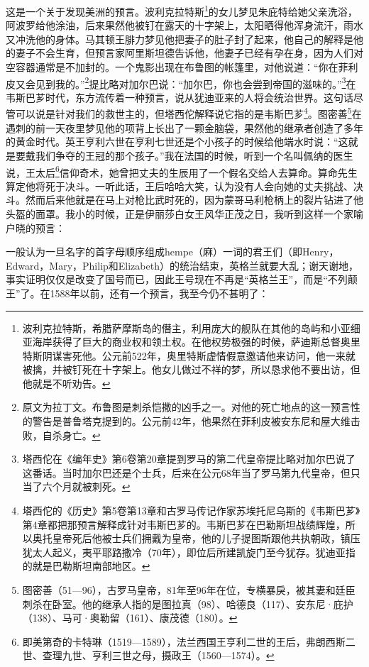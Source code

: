 \par 这是一个关于发现美洲的预言。波利克拉特斯\footnote{波利克拉特斯，希腊萨摩斯岛的僭主，利用庞大的舰队在其他的岛屿和小亚细亚海岸获得了巨大的商业权和领土权。在他权势极强的时候，萨迪斯总督奥里特斯阴谋害死他。公元前522年，奥里特斯虚情假意邀请他来访问，他一来就被擒，并被钉死在十字架上。他女儿做过不祥的梦，所以恳求他不要出访，但他就是不听劝告。}的女儿梦见朱庇特给她父亲洗浴，阿波罗给他涂油，后来果然他被钉在露天的十字架上，太阳晒得他浑身流汗，雨水又冲洗他的身体。马其顿王腓力梦见他把妻子的肚子封了起来，他自己的解释是他的妻子不会生育，但预言家阿里斯坦德告诉他，他妻子已经有孕在身，因为人们对空容器通常是不加封的。一个鬼影出现在布鲁图的帐篷里，对他说道：“你在菲利皮又会见到我的。”\footnote{原文为拉丁文。布鲁图是刺杀恺撒的凶手之一。对他的死亡地点的这一预言性的警告是普鲁塔克提到的。公元前42年，他果然在菲利皮被安东尼和屋大维击败，自杀身亡。}提比略对加尔巴说：“加尔巴，你也会尝到帝国的滋味的。”\footnote{塔西佗在《编年史》第6卷第20章提到罗马的第二代皇帝提比略对加尔巴说了这番话。当时加尔巴还是个士兵，后来在公元68年当了罗马第九代皇帝，但只当了六个月就被刺死。}在韦斯巴芗时代，东方流传着一种预言，说从犹迪亚来的人将会统治世界。这句话尽管可以说是针对我们的救世主的，但塔西佗解释说它指的是韦斯巴芗\footnote{塔西佗的《历史》第5卷第13章和古罗马传记作家苏埃托尼乌斯的《韦斯巴芗》第4章都把那预言解释成针对韦斯巴芗的。韦斯巴芗在巴勒斯坦战绩辉煌，所以奥托皇帝死后他被士兵们拥戴为皇帝，他的儿子提图斯跟他共执朝政，镇压犹太人起义，夷平耶路撒冷（70年），即位后所建凯旋门至今犹存。犹迪亚指的就是巴勒斯坦南部地区。}。图密善\footnote{图密善（51—96），古罗马皇帝，81年至96年在位，专横暴戾，被其妻和廷臣刺杀在卧室。他的继承人指的是图拉真（98）、哈德良（117）、安东尼·庇护（138）、马可·奥勒留（161）、康茂德（180）。}在遇刺的前一天夜里梦见他的项背上长出了一颗金脑袋，果然他的继承者创造了多年的黄金时代。英王亨利六世在亨利七世还是个小孩子的时候给他端水时说：“这就是要戴我们争夺的王冠的那个孩子。”我在法国的时候，听到一个名叫佩纳的医生说，王太后\footnote{即美第奇的卡特琳（1519—1589），法兰西国王亨利二世的王后，弗朗西斯二世、查理九世、亨利三世之母，摄政王（1560—1574）。}信仰奇术，她曾把丈夫的生辰用了一个假名交给人去算命。算命先生算定他将死于决斗。一听此话，王后哈哈大笑，认为没有人会向她的丈夫挑战、决斗。然而后来他就是在马上对枪比武时死的，因为蒙哥马利枪柄上的裂片钻进了他头盔的面罩。我小的时候，正是伊丽莎白女王风华正茂之日，我听到这样一个家喻户晓的预言：
\par 一般认为一旦名字的首字母顺序组成hempe（麻）一词的君王们（即Henry，Edward，Mary，Philip和Elizabeth）的统治结束，英格兰就要大乱；谢天谢地，事实证明仅仅是改变了国号而已，因此王号现在不再是“英格兰王”，而是“不列颠王”了。在1588年以前，还有一个预言，我至今仍不甚明了：
